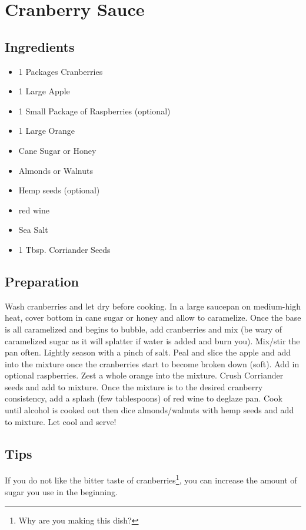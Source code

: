 \thispagestyle{fancy}
\section{Cranberry Sauce} \label{cranberrysauce}
\AddToShipoutPicture*{\CranberrySauce}


\subsection*{Ingredients}

\begin{multicols}{3}
	\begin{itemize}
		\item 1 Packages Cranberries
		\item 1 Large Apple
  		\item 1 Small Package of Raspberries (optional)
		\item 1 Large Orange
		\item Cane Sugar or Honey
		\item Almonds or Walnuts
		\item Hemp seeds (optional)
		\item red wine
		\item Sea Salt
  		\item 1 Tbsp. Corriander Seeds 
	\end{itemize}
\end{multicols}

\subsection*{Preparation}
	Wash cranberries and let dry before cooking. In a large saucepan on medium-high heat, cover bottom in cane sugar or honey and allow to caramelize. Once the base is all caramelized and begins to bubble, add cranberries and mix (be wary of caramelized sugar as it will splatter if water is added and burn you). Mix/stir the pan often. Lightly season with a pinch of salt. Peal and slice the apple and add into the mixture once the cranberries start to become broken down (soft). Add in optional raspberries. Zest a whole orange into the mixture. Crush Corriander seeds and add to mixture. Once the mixture is to the desired cranberry consistency, add a splash (few tablespoons) of red wine to deglaze pan. Cook until alcohol is cooked out then dice almonds/walnuts with hemp seeds and add to mixture. Let cool and serve! 

\subsection*{Tips}
	If you do not like the bitter taste of cranberries\footnote{Why are you making this dish?}, you can increase the amount of sugar you use in the beginning. 
